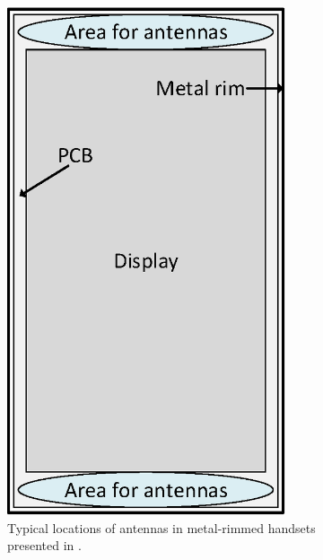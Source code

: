\begin{figure}[H]
\centering
    \begin{subfigure}[b]{0.4\textwidth}
        \includegraphics[width=0.9\textwidth]{img/metal_rim.eps}
        \caption{Typical locations of antennas in metal-rimmed handsets presented in \cite{ban_low_profile}.}
        \label{fig:metal_rim}
    \end{subfigure}
    \hspace{20pt}
    \begin{subfigure}[b]{0.4\textwidth}

\end{subfigure}
\end{figure}
